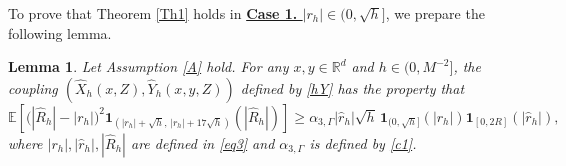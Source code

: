 \documentclass[aap]{imsart}
\theoremstyle{plain}
\newtheorem{lemma}[theorem]{Lemma}
\theoremstyle{definition}
\begin{document}
		
To prove that Theorem \ref{Th1} holds in \underline{\bf{Case 1. \textit{ $|r_h|\in(0, \sqrt{h}]$}}}, we prepare the following lemma.

\begin{lemma}\label{Le9}
	Let Assumption \ref{A} hold. For any \(x,y\in\mathbb R^d\) and
	\(h\in(0,M^{-2}]\), the coupling \((\hat X_h(x,Z),\hat Y_h(x,y,Z))\) defined by \eqref{hY} has the property that 
	\[\mathbb E\left[
		\bigl(|\hat R_h|-|r_h|\bigr)^2
		\mathbf 1_{(|r_h|+\sqrt h,\,|r_h|+17\sqrt h)}
		(|\hat R_h|)
		\right]\geqslant
		\alpha_{3,\Gamma}
		|\hat r_h|\sqrt h\,
		\mathbf 1_{(0,\sqrt h]}(|r_h|)
		\mathbf 1_{[0,2R]}(|\hat r_h|),\]
		where $|r_h|, |\hat{r}_h|, |\hat{R}_h|$ are defined in \eqref{eq3} and $\alpha_{3, \Gamma}$ is defined by \eqref{c1}.
\end{lemma}
\end{document}
